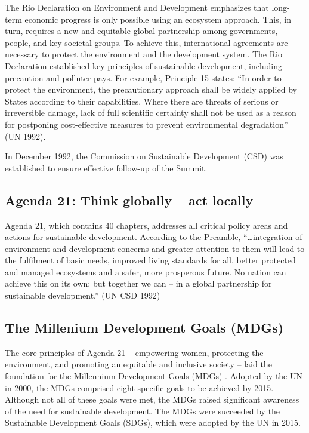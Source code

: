 \documentclass[
  a4paper,
  openany]{book}
\begin{document}
The Rio Declaration on Environment and Development emphasizes that
long-term economic progress is only possible using an ecosystem
approach. This, in turn, requires a new and equitable global partnership
among governments, people, and key societal groups. To achieve this,
international agreements are necessary to protect the environment and
the development system. The Rio Declaration established key principles
of sustainable development, including precaution and polluter pays. For
example, Principle 15 states: ``In order to protect the environment, the
precautionary approach shall be widely applied by States according to
their capabilities. Where there are threats of serious or irreversible
damage, lack of full scientific certainty shall not be used as a reason
for postponing cost-effective measures to prevent environmental
degradation'' (UN 1992).

In December 1992, the Commission on Sustainable Development (CSD) was
established to ensure effective follow-up of the Summit.

\subsection{Agenda 21: Think globally -- act
locally}\label{agenda-21-think-globally-act-locally}

Agenda 21, which contains 40 chapters, addresses all critical policy
areas and actions for sustainable development. According to the
Preamble, ``\ldots integration of environment and development concerns
and greater attention to them will lead to the fulfilment of basic
needs, improved living standards for all, better protected and managed
ecosystems and a safer, more prosperous future. No nation can achieve
this on its own; but together we can -- in a global partnership for
sustainable development.'' (UN CSD 1992)

\subsection{The Millenium Development Goals
(MDGs)}\label{the-millenium-development-goals-mdgs}

The core principles of Agenda 21 -- empowering women, protecting the
environment, and promoting an equitable and inclusive society -- laid
the foundation for the Millennium Development Goals (MDGs) . Adopted by
the UN in 2000, the MDGs comprised eight specific goals to be achieved
by 2015. Although not all of these goals were met, the MDGs raised
significant awareness of the need for sustainable development. The MDGs
were succeeded by the Sustainable Development Goals (SDGs), which were
adopted by the UN in 2015.
\end{document}
